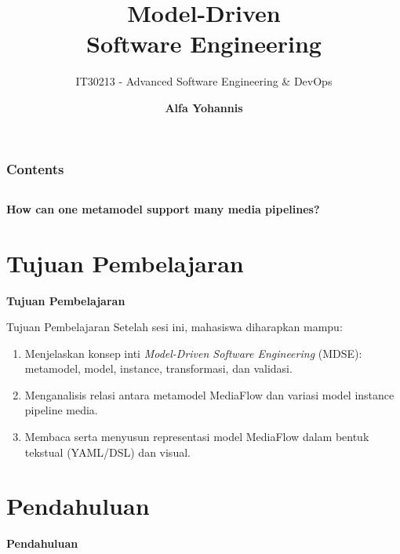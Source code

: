 \documentclass[aspectratio=169, table]{beamer}
\subtitle{IT30213 - Advanced Software Engineering \& DevOps}
\title{\Huge Model-Driven\vspace{8pt}\\
	Software Engineering}
\author{\textbf{Alfa Yohannis}}
\begin{document}
\frame{\titlepage}

\begin{frame}[fragile]
	\frametitle{Contents}
	\vspace{20pt}
	\begin{columns}[t]
		\tableofcontents[sections={1-5}]

		\tableofcontents[sections={6-20}]
	\end{columns}
\end{frame}

\begin{frame}{\hfill}
	\centering
	\Huge{\textbf{How can one metamodel support many media pipelines?}}
\end{frame}

\section{Tujuan Pembelajaran}
\begin{frame}{\hfill}
	\centering
	\Huge{\textbf{Tujuan Pembelajaran}}
\end{frame}

\begin{frame}{Tujuan Pembelajaran}
\vspace{6pt}
Setelah sesi ini, mahasiswa diharapkan mampu:
\begin{enumerate}
  \item Menjelaskan konsep inti \textit{Model-Driven Software Engineering} (MDSE): metamodel, model, instance, transformasi, dan validasi.
  \item Menganalisis relasi antara metamodel MediaFlow dan variasi model instance pipeline media.
  \item Membaca serta menyusun representasi model MediaFlow dalam bentuk tekstual (YAML/DSL) dan visual.
\end{enumerate}
\end{frame}

\section{Pendahuluan}
\begin{frame}{\hfill}
	\centering
	\Huge{\textbf{Pendahuluan}}
\end{frame}
\end{document}
